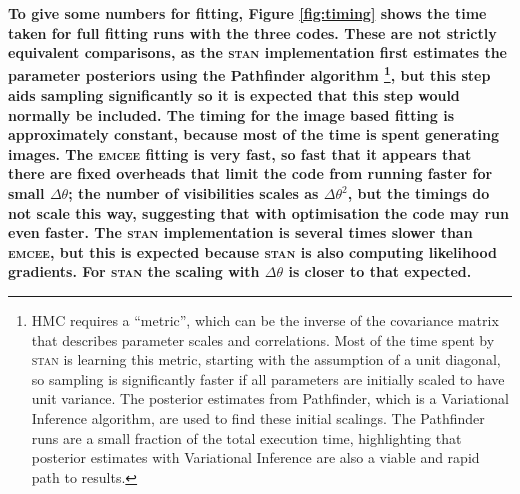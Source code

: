 \documentclass[fleqn,usenatbib]{mnras}
\begin{document}
\textbf{To give some numbers for fitting, Figure \ref{fig:timing} shows the time taken for full fitting runs with the three codes. These are not strictly equivalent comparisons, as the \textsc{stan} implementation first estimates the parameter posteriors using the Pathfinder algorithm \citep{JMLR:v23:21-0889}\footnote{HMC requires a ``metric'', which can be the inverse of the covariance matrix that describes parameter scales and correlations. Most of the time spent by \textsc{stan} is learning this metric, starting with the assumption of a unit diagonal, so sampling is significantly faster if all parameters are initially scaled to have unit variance. The posterior estimates from Pathfinder, which is a Variational Inference algorithm, are used to find these initial scalings. The Pathfinder runs are a small fraction of the total execution time, highlighting that posterior estimates with Variational Inference are also a viable and rapid path to results.}, but this step aids sampling significantly so it is expected that this step would normally be included. The timing for the image based fitting is approximately constant, because most of the time is spent generating images. The \textsc{emcee} fitting is very fast, so fast that it appears that there are fixed overheads that limit the code from running faster for small $\Delta \theta$; the number of visibilities scales as $\Delta \theta^2$, but the timings do not scale this way, suggesting that with optimisation the code may run even faster. The \textsc{stan} implementation is several times slower than \textsc{emcee}, but this is expected because \textsc{stan} is also computing likelihood gradients. For \textsc{stan} the scaling with $\Delta \theta$ is closer to that expected.}

\end{document}
